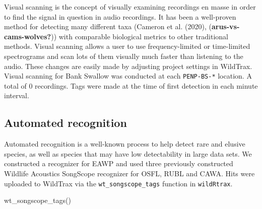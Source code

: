 \documentclass[
  letterpaper,
  DIV=11,
  numbers=noendperiod,
  oneside]{scrartcl}
\newenvironment{Shaded}{\begin{snugshade}}{\end{snugshade}}
\newcommand{\FunctionTok}[1]{\textcolor[rgb]{0.28,0.35,0.67}{#1}}
\newcommand{\NormalTok}[1]{\textcolor[rgb]{0.00,0.23,0.31}{#1}}
\begin{document}
Visual scanning is the concept of visually examining recordings en masse
in order to find the signal in question in audio recordings. It has been
a well-proven method for detecting many different taxa (Cameron et al.
(2020),
(\textbf{arus-vs-cams-wolves?}))
with comparable biological metrics to other traditional methods. Visual
scanning allows a user to use frequency-limited or time-limited
spectrograms and scan lots of them visually much faster than listening
to the audio. These changes are easily made by adjusting project
settings in WildTrax. Visual scanning for Bank Swallow was conducted at
each \texttt{PENP-BS-*} location. A total of 0 recordings. Tags were
made at the time of first detection in each minute interval.

\hypertarget{automated-recognition}{%
\subsection{Automated recognition}\label{automated-recognition}}

Automated recognition is a well-known process to help detect rare and
elusive species, as well as species that may have low detectability in
large data sets. We constructed a recognizer for EAWP and used three
previously constructed Wildlife Acoustics SongScope recognizer for OSFL,
RUBL and CAWA. Hits were uploaded to WildTrax via the
\texttt{wt\_songscope\_tags} function in \texttt{wildRtrax}.

\begin{Shaded}
\begin{Highlighting}[]
\FunctionTok{wt\_songscope\_tags}\NormalTok{()}
\end{Highlighting}
\end{Shaded}
\end{document}
